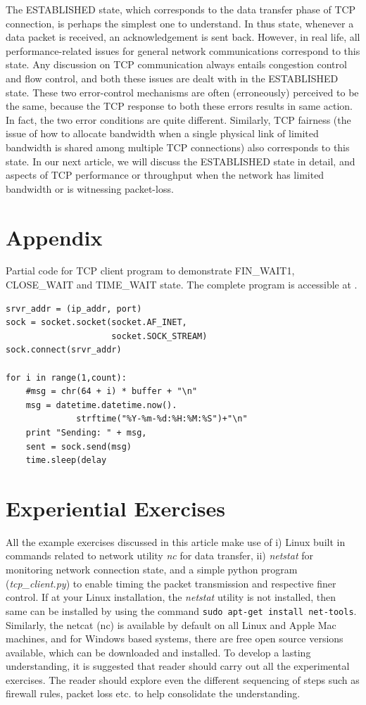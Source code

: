 \begin{multicols}{2}
The ESTABLISHED state, which corresponds to the data transfer phase of TCP connection, is perhaps the simplest one to understand. In thus state, whenever a data packet is received, an acknowledgement is sent back. However, in real life, all performance-related issues for general network communications correspond to this state. Any discussion on TCP communication always entails congestion control and flow control, and both these issues are dealt with in the ESTABLISHED state. These two error-control mechanisms are often (erroneously) perceived to be the same, because the TCP response to both these errors results in same action. In fact, the two error conditions are quite different. Similarly, TCP fairness (the issue of how to allocate bandwidth when a single physical link of limited bandwidth is shared among multiple TCP connections) also corresponds to this state. In our next article, we will discuss the ESTABLISHED state in detail, and aspects of TCP performance or throughput when the network has limited bandwidth or is witnessing packet-loss.

\section*{Appendix}

Partial code for TCP client program to demonstrate FIN\_WAIT1, CLOSE\_WAIT and TIME\_WAIT state. The complete program is accessible at \cite{chap3-key10}.
\begin{verbatim}
srvr_addr = (ip_addr, port)
sock = socket.socket(socket.AF_INET, 
                     socket.SOCK_STREAM)
sock.connect(srvr_addr)

for i in range(1,count):
    #msg = chr(64 + i) * buffer + "\n"
    msg = datetime.datetime.now().
	          strftime("%Y-%m-%d:%H:%M:%S")+"\n"
    print "Sending: " + msg,
    sent = sock.send(msg)
    time.sleep(delay
\end{verbatim}

\section*{Experiential Exercises}

All the example exercises discussed in this article make use of i) Linux built in commands related to network utility \textit{nc} for data transfer, ii) \textit{netstat} for monitoring network connection state, and a simple python program (\textit{tcp\_client.py}) to enable timing the packet transmission and respective finer control. If at your Linux installation, the \textit{netstat} utility is not installed, then same can be installed by using the command \lstinline|sudo apt-get install net-tools|. Similarly, the netcat (nc) is available by default on all Linux and Apple Mac machines, and for Windows based systems, there are free open source versions available, which can be downloaded and installed. To develop a lasting understanding, it is suggested that reader should carry out all the experimental exercises. The reader should explore even the different sequencing of steps such as firewall rules, packet loss etc. to help consolidate the understanding.


\end{multicols}
